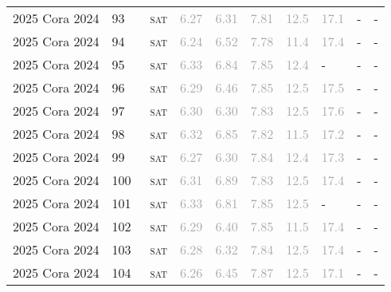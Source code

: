 \begin{center}
{\begin{longtable}{@{}llllllllll@{}}
2025 Cora 2024 & 93 & ~\textsc{sat} & \textcolor{darkgray}{6.27} & \textcolor{darkgray}{6.31} & \textcolor{darkgray}{7.81} & \textcolor{darkgray}{12.5} & \textcolor{darkgray}{17.1} & - & - \\
2025 Cora 2024 & 94 & ~\textsc{sat} & \textcolor{darkgray}{6.24} & \textcolor{darkgray}{6.52} & \textcolor{darkgray}{7.78} & \textcolor{darkgray}{11.4} & \textcolor{darkgray}{17.4} & - & - \\
2025 Cora 2024 & 95 & ~\textsc{sat} & \textcolor{darkgray}{6.33} & \textcolor{darkgray}{6.84} & \textcolor{darkgray}{7.85} & \textcolor{darkgray}{12.4} & - & - & - \\
2025 Cora 2024 & 96 & ~\textsc{sat} & \textcolor{darkgray}{6.29} & \textcolor{darkgray}{6.46} & \textcolor{darkgray}{7.85} & \textcolor{darkgray}{12.5} & \textcolor{darkgray}{17.5} & - & - \\
2025 Cora 2024 & 97 & ~\textsc{sat} & \textcolor{darkgray}{6.30} & \textcolor{darkgray}{6.30} & \textcolor{darkgray}{7.83} & \textcolor{darkgray}{12.5} & \textcolor{darkgray}{17.6} & - & - \\
2025 Cora 2024 & 98 & ~\textsc{sat} & \textcolor{darkgray}{6.32} & \textcolor{darkgray}{6.85} & \textcolor{darkgray}{7.82} & \textcolor{darkgray}{11.5} & \textcolor{darkgray}{17.2} & - & - \\
2025 Cora 2024 & 99 & ~\textsc{sat} & \textcolor{darkgray}{6.27} & \textcolor{darkgray}{6.30} & \textcolor{darkgray}{7.84} & \textcolor{darkgray}{12.4} & \textcolor{darkgray}{17.3} & - & - \\
2025 Cora 2024 & 100 & ~\textsc{sat} & \textcolor{darkgray}{6.31} & \textcolor{darkgray}{6.89} & \textcolor{darkgray}{7.83} & \textcolor{darkgray}{12.5} & \textcolor{darkgray}{17.4} & - & - \\
2025 Cora 2024 & 101 & ~\textsc{sat} & \textcolor{darkgray}{6.33} & \textcolor{darkgray}{6.81} & \textcolor{darkgray}{7.85} & \textcolor{darkgray}{12.5} & - & - & - \\
2025 Cora 2024 & 102 & ~\textsc{sat} & \textcolor{darkgray}{6.29} & \textcolor{darkgray}{6.40} & \textcolor{darkgray}{7.85} & \textcolor{darkgray}{11.5} & \textcolor{darkgray}{17.4} & - & - \\
2025 Cora 2024 & 103 & ~\textsc{sat} & \textcolor{darkgray}{6.28} & \textcolor{darkgray}{6.32} & \textcolor{darkgray}{7.84} & \textcolor{darkgray}{12.5} & \textcolor{darkgray}{17.4} & - & - \\
2025 Cora 2024 & 104 & ~\textsc{sat} & \textcolor{darkgray}{6.26} & \textcolor{darkgray}{6.45} & \textcolor{darkgray}{7.87} & \textcolor{darkgray}{12.5} & \textcolor{darkgray}{17.1} & - & - \\

\end{longtable}}
\end{center}
